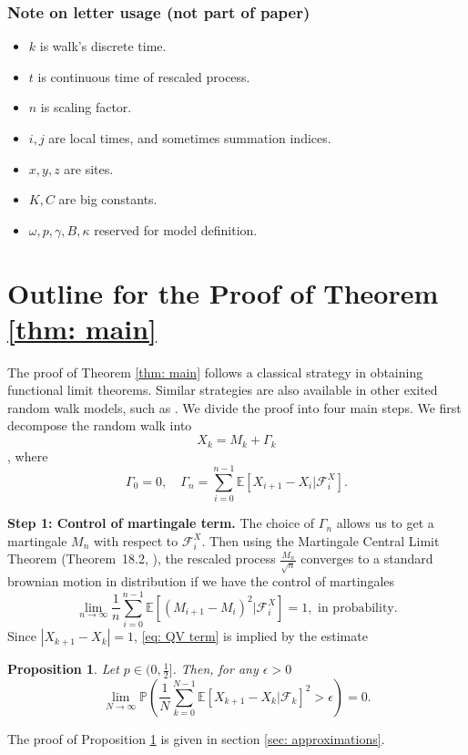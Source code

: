 \documentclass[twoside,12pt,a4paper]{article}
\newtheorem{proposition}{Proposition}[section]
\numberwithin{equation}{section}
\newcommand{\abs}[1]{\left\vert #1 \right\vert}
\begin{document}
	\subsubsection{Note on letter usage (not part of paper)}
	
	\begin{itemize}
		\item $k$ is walk's discrete time.
		\item $t$ is continuous time of rescaled process.
		\item $n$ is scaling factor.
		\item $i, j$ are local times, and sometimes summation indices.
		\item $x, y, z$ are sites.
		\item $K, C$ are big constants.
		\item $\omega, p, \gamma, B, \kappa$ reserved for model definition.
	\end{itemize}
	
	
	\section{Outline for the Proof of Theorem \ref{thm: main}}\label{sec: proof of main}
	The proof of Theorem \ref{thm: main} follows a classical strategy in obtaining functional limit theorems. 
	Similar strategies are also available in other exited random walk models, such as \cite{KP16,KMP22}.
	 We divide the proof into four main steps. We first decompose the random walk into
	\[
	X_k = M_k+ \Gamma_k 
\] ,
	where
	$$ 
	\Gamma_0 = 0, \quad \Gamma_n = \sum_{i=0}^{n-1} \mathbb{E}\left[ X_{i+1}-X_i | \mathcal{F}_i^X \right].
	$$ 
	
	\textbf{Step 1: Control of martingale term.}
	The choice of $\Gamma_n$ allows us to get a martingale $M_n$ with respect to $\mathcal{F}_i^X.$ Then using the Martingale Central Limit Theorem (Theorem~18.2, \cite{B99}), the rescaled process $\frac{M_n}{\sqrt{n}}$ converges to a standard brownian motion in distribution if we have the control of martingales 
	\begin{equation}\label{eq: QV term}
		\lim_{n\to \infty}\frac{1}{n} \sum_{i=0}^{n-1}\mathbb{E}\left[ (M_{i+1}- M_{i})^2 |\mathcal{F}_i^X \right] =1,  \mbox{ in probability}.
	\end{equation}
	Since $\abs{X_{k+1}-X_k}=1$,  \eqref{eq: QV term} is implied by the estimate
	\begin{proposition} \label{lm: control of martingale} 
		Let $p\in (0,\frac{1}{2}]$. Then, for any $\epsilon >0$
		\begin{equation}\label{eq:  term}
			\lim_{N \to \infty }\mathbb{P}\left(\frac{1}{N} \sum_{k = 0}^{N-1} \mathbb{E}\left[ X_{k+1} - X_k | \mathcal{F}_k \right]^2 > \epsilon \right) =0. 
		\end{equation}
	\end{proposition}
	The proof of Proposition \ref{lm: control of martingale} is given in section \ref{sec: approximations}.
	
\end{document}
